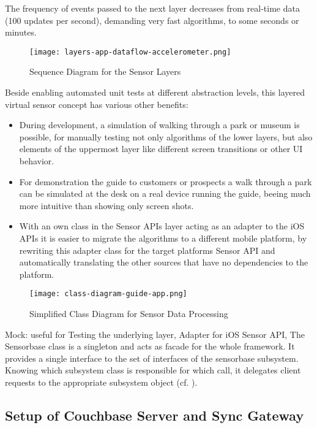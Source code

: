 The frequency of events passed to the next layer decreases from real-time data (100 updates per second), demanding very fast algorithms, to some seconds or minutes.

\begin{figure}[H]
\centering
\texttt{[image: layers-app-dataflow-accelerometer.png]}
\caption{Sequence Diagram for the Sensor Layers}
\end{figure}

Beside enabling automated unit tests at different abstraction levels, this layered virtual sensor concept has various other benefits:

\begin{itemize}
\item During development, a simulation of walking through a park or museum is possible, for manually testing not only algorithms of the lower layers, but also elements of the uppermost layer like different screen transitions or other UI behavior.
\item For demonstration the guide to customers or prospects a walk through a park can be simulated at the desk on a real device running the guide, beeing much more intuitive than showing only screen shots.
\item With an own class in the Sensor APIs layer acting as an adapter to the iOS APIs it is easier to migrate the algorithms to a different mobile platform, by rewriting this adapter class for the target platforms Sensor API and automatically translating the other sources that have no dependencies to the platform.
\end{itemize}



\begin{figure}[H]
\centering
\texttt{[image: class-diagram-guide-app.png]}
\caption{Simplified Class Diagram for Sensor Data Processing}
\end{figure}

Mock: useful for Testing the underlying layer,
Adapter for iOS Sensor API,
The Sensorbase class is a singleton and acts as facade for the whole framework. It provides a single interface to the set of interfaces of the sensorbase subsystem. Knowing which subsystem class is responsible for which call, it delegates client requests to the appropriate subsystem object (cf. \cite{gof}).

\subsection{Setup of Couchbase Server and Sync Gateway}

